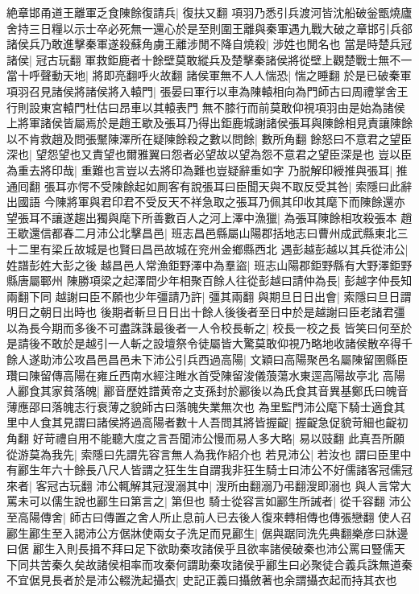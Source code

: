 絶章邯甬道王離軍乏食陳餘復請兵|{
	復扶又翻}
項羽乃悉引兵渡河皆沈船破釡甑燒廬舍持三日糧以示士卒必死無一還心於是至則圍王離與秦軍遇九戰大破之章邯引兵郤諸侯兵乃敢進擊秦軍遂殺蘇角虜王離涉閒不降自燒殺|{
	涉姓也閒名也}
當是時楚兵冠諸侯|{
	冠古玩翻}
軍救鉅鹿者十餘壁莫敢縱兵及楚擊秦諸侯將從壁上觀楚戰士無不一當十呼聲動天地|{
	將即亮翻呼火故翻}
諸侯軍無不人人惴恐|{
	惴之睡翻}
於是已破秦軍項羽召見諸侯將諸侯將入轅門|{
	張晏曰軍行以車為陳轅相向為門師古曰周禮掌舍王行則設東宮轅門杜估曰昂車以其轅表門}
無不膝行而前莫敢仰視項羽由是始為諸侯上將軍諸侯皆屬焉於是趙王歇及張耳乃得出鉅鹿城謝諸侯張耳與陳餘相見責讓陳餘以不肯救趙及問張黶陳澤所在疑陳餘殺之數以問餘|{
	數所角翻}
餘怒曰不意君之望臣深也|{
	望怨望也又責望也爾雅翼曰怨者必望故以望為怨不意君之望臣深是也}
豈以臣為重去將印哉|{
	重難也言豈以去將印為難也豈疑辭重如字}
乃脱解印綬推與張耳|{
	推通囘翻}
張耳亦愕不受陳餘起如厠客有說張耳曰臣聞天與不取反受其咎|{
	索隱曰此辭出國語}
今陳將軍與君印君不受反天不祥急取之張耳乃佩其印收其麾下而陳餘還亦望張耳不讓遂趨出獨與麾下所善數百人之河上澤中漁獵|{
	為張耳陳餘相攻殺張本}
趙王歇還信都春二月沛公北擊昌邑|{
	班志昌邑縣屬山陽郡括地志曰曹州成武縣東北三十二里有梁丘故城是也賢曰昌邑故城在兖州金鄉縣西北}
遇彭越彭越以其兵從沛公|{
	姓譜彭姓大彭之後}
越昌邑人常漁鉅野澤中為羣盜|{
	班志山陽郡鉅野縣有大野澤鉅野縣唐屬鄆州}
陳勝項梁之起澤間少年相聚百餘人往從彭越曰請仲為長|{
	彭越字仲長知兩翻下同}
越謝曰臣不願也少年彊請乃許|{
	彊其兩翻}
與期旦日日出會|{
	索隱曰旦日謂明日之朝日出時也}
後期者斬旦日日出十餘人後後者至日中於是越謝曰臣老諸君彊以為長今期而多後不可盡誅誅最後者一人令校長斬之|{
	校長一校之長}
皆笑曰何至於是請後不敢於是越引一人斬之設壇祭令徒屬皆大驚莫敢仰視乃略地收諸侯散卒得千餘人遂助沛公攻昌邑昌邑未下沛公引兵西過高陽|{
	文穎曰高陽聚邑名屬陳留圉縣臣瓚曰陳留傳高陽在雍丘西南水經注睢水首受陳留浚儀蒗蕩水東逕高陽故亭北}
高陽人酈食其家貧落魄|{
	酈音歷姓譜黄帝之支孫封於酈後以為氏食其音異基鄭氏曰魄音薄應邵曰落魄志行衰薄之貌師古曰落魄失業無次也}
為里監門沛公麾下騎士適食其里中人食其見謂曰諸侯將過高陽者數十人吾問其將皆握齪|{
	握齪急促貌苛細也齪初角翻}
好苛禮自用不能聽大度之言吾聞沛公慢而易人多大略|{
	易以豉翻}
此真吾所願從游莫為我先|{
	索隱曰先謂先容言無人為我作紹介也}
若見沛公|{
	若汝也}
謂曰臣里中有酈生年六十餘長八尺人皆謂之狂生生自謂我非狂生騎士曰沛公不好儒諸客冠儒冠來者|{
	客冠古玩翻}
沛公輒解其冠溲溺其中|{
	溲所由翻溺乃弔翻溲即溺也}
與人言常大罵未可以儒生說也酈生曰第言之|{
	第但也}
騎士從容言如酈生所誡者|{
	從千容翻}
沛公至高陽傳舍|{
	師古曰傳置之舍人所止息前人已去後人復來轉相傳也傳張戀翻}
使人召酈生酈生至入謁沛公方倨牀使兩女子洗足而見酈生|{
	倨與踞同洗先典翻樂彦曰牀邊曰倨}
酈生入則長揖不拜曰足下欲助秦攻諸侯乎且欲率諸侯破秦也沛公罵曰豎儒天下同共苦秦久矣故諸侯相率而攻秦何謂助秦攻諸侯乎酈生曰必聚徒合義兵誅無道秦不宜倨見長者於是沛公輟洗起攝衣|{
	史記正義曰攝斂著也余謂攝衣起而持其衣也}
